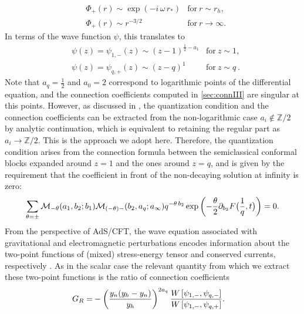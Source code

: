 \documentclass[11pt]{article}
\numberwithin{equation}{section}
\newcommand{\be}{\begin{equation}}
\newcommand{\ee}{\end{equation}}
\newcommand{\ba}{\begin{aligned}}
\newcommand{\ea}{\end{aligned}}
\begin{document}
\begin{equation}
\begin{aligned}
&\Phi_+(r)\sim \exp(-i\,\omega\,r_*)  &\text{for}\ r\sim r_h,\\
&\Phi_+(r)\sim r^{-3/2}&\text{for}\ r\to \infty.
\end{aligned}
\end{equation}
In terms of the wave function $\psi$, this translates to
\begin{equation}\label{bcAdS5}
\begin{aligned}
&\psi(z)=\psi_{1,-}(z)\sim (z-1)^{\frac{1}{2}-a_1}  &\text{for}\ z\sim 1,\\
&\psi(z)=\psi_{q,+}(z)\sim (z-q)^1 &\text{for}\ z\sim q~.
\end{aligned}
\end{equation} Note that $a_q = \frac{1}{2}$ and $a_0 = 2$  correspond to logarithmic points of the differential equation, and the connection coefficients computed in \autoref{sec:connIII} are singular at this points. However, as discussed in \cite{Jia:2024zes,unpGGDC}, the quantization condition and the connection coefficients can be extracted from the non-logarithmic case $a_i \notin \mathbb{Z}/2$ by analytic continuation,  which is equivalent to retaining the regular part as  $a_i \to \mathbb{Z}/2$. This is the approach we  adopt here.
Therefore, the quantization condition arises from the connection formula between the semiclassical conformal blocks expanded around $z=1$ and the ones around $z=q$, and is given by the requirement that the coefficient in front of the non-decaying solution at infinity is zero:
\begin{equation}\label{eq:qcch}
\begin{aligned}
\sum_{\theta=\pm}\mathcal{M}_{-\theta}(a_1,b_2;b_1)\mathcal{M}_{(-\theta)-}(b_2,a_{q};a_{\infty})q^{-\theta\,b_2}\exp\left(-\frac{\theta}{2}\partial_{b_2}F\big({1\over q},t\big)\right)=0.
\end{aligned}
\end{equation}
%
From the perspective of AdS/CFT, the wave equation associated with gravitational and electromagnetic perturbations encodes information about the two-point functions of (mixed)  stress-energy tensor and conserved currents, respectively \cite{Son:2002sd,Kovtun:2005ev}. As in the scalar case the relevant quantity from which we extract these two-point functions is the ratio of connection coefficients 
\be\ba G_R=&-\left(\frac{y_n (y_h-y_n)}{y_h}\right)^{2a_q}{W\left[\psi_{1,-},\psi_{q,-}\right]\over W\left[ \psi_{1,-},\psi_{q,+}\right] }.\ea\ee
\end{document}
